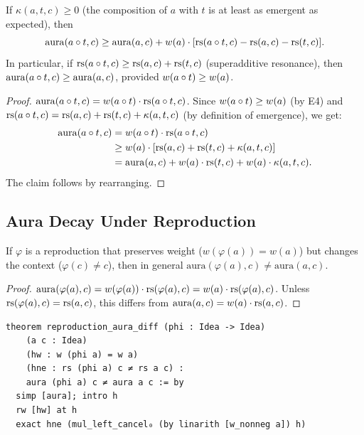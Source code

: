 \begin{theorem}
\label{thm:aura-composition}
If $\kappa(a, t, c) \geq 0$ (the composition of $a$ with $t$ is at least as emergent as expected), then
\[
  \mathrm{aura}(a \circ t, c) \geq \mathrm{aura}(a, c) + w(a) \cdot [\mathrm{rs}(a \circ t, c) - \mathrm{rs}(a, c) - \mathrm{rs}(t, c)].
\]
In particular, if $\mathrm{rs}(a \circ t, c) \geq \mathrm{rs}(a, c) + \mathrm{rs}(t, c)$ (superadditive resonance), then $\mathrm{aura}(a \circ t, c) \geq \mathrm{aura}(a, c)$, provided $w(a \circ t) \geq w(a)$.
\end{theorem}

\begin{proof}
$\mathrm{aura}(a \circ t, c) = w(a \circ t) \cdot \mathrm{rs}(a \circ t, c)$.  Since $w(a \circ t) \geq w(a)$ (by E4) and $\mathrm{rs}(a \circ t, c) = \mathrm{rs}(a, c) + \mathrm{rs}(t, c) + \kappa(a, t, c)$ (by definition of emergence), we get:
\begin{align*}
\mathrm{aura}(a \circ t, c) &= w(a \circ t) \cdot \mathrm{rs}(a \circ t, c) \\
&\geq w(a) \cdot [\mathrm{rs}(a, c) + \mathrm{rs}(t, c) + \kappa(a, t, c)] \\
&= \mathrm{aura}(a, c) + w(a) \cdot \mathrm{rs}(t, c) + w(a) \cdot \kappa(a, t, c).
\end{align*}
The claim follows by rearranging.
\end{proof}

\subsection{Aura Decay Under Reproduction}

\begin{theorem}
\label{thm:reproduction-aura}
If $\varphi$ is a reproduction that preserves weight ($w(\varphi(a)) = w(a)$)
but changes the context ($\varphi(c) \neq c$), then in general
$\mathrm{aura}(\varphi(a), c) \neq \mathrm{aura}(a, c)$.
\end{theorem}

\begin{proof}
$\mathrm{aura}(\varphi(a), c) = w(\varphi(a)) \cdot \mathrm{rs}(\varphi(a), c)
= w(a) \cdot \mathrm{rs}(\varphi(a), c)$.  Unless $\mathrm{rs}(\varphi(a), c) = \mathrm{rs}(a, c)$,
this differs from $\mathrm{aura}(a, c) = w(a) \cdot \mathrm{rs}(a, c)$.
\end{proof}

\begin{lstlisting}
theorem reproduction_aura_diff (phi : Idea -> Idea)
    (a c : Idea)
    (hw : w (phi a) = w a)
    (hne : rs (phi a) c ≠ rs a c) :
    aura (phi a) c ≠ aura a c := by
  simp [aura]; intro h
  rw [hw] at h
  exact hne (mul_left_cancel₀ (by linarith [w_nonneg a]) h)
\end{lstlisting}

